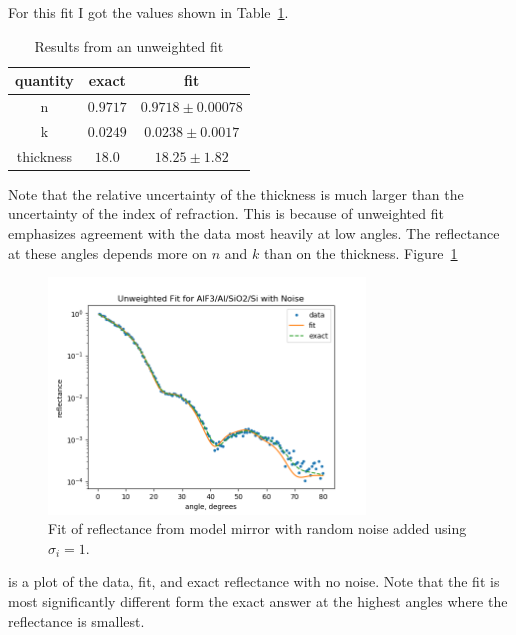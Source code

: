 \documentclass[english]{scrartcl}
\begin{document}
For this fit I got the values shown in Table~\ref{tab:unweighted}.
\begin{table}[htb]
\begin{center}
\begin{tabular}{| c | c | c |}
\hline
quantity & exact & fit\\ \hline\hline
n & $0.9717$ & $0.9718\pm 0.00078$\\
k & $0.0249$ & $0.0238\pm 0.0017$\\
thickness & $18.0$ & $18.25\pm 1.82$\\ \hline
\end{tabular}
\end{center}
\caption{\label{tab:unweighted}Results from an unweighted fit}
\end{table}
Note that the relative  uncertainty of the thickness is much larger than
the uncertainty of the index of refraction. This is because of unweighted
fit emphasizes agreement with the data most heavily at low angles. The
reflectance at these angles depends more on $n$ and $k$ than on the
thickness.
Figure~\ref{fig:unweighted}
\begin{figure}[htb]
  \begin{center}
    \includegraphics[width=0.75\textwidth]{images/eqweight}
  \end{center}
  \caption{\label{fig:unweighted}Fit of reflectance from model mirror with random noise added using $\sigma_i=1$.}
\end{figure}
is a plot of the data, fit, and exact reflectance with no noise. Note
that the fit is most significantly different form the exact answer
at the highest angles where the reflectance is smallest.
\end{document}
